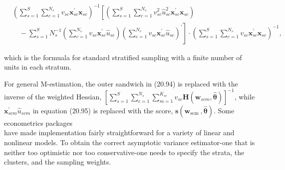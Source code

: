 \documentclass[10pt]{article}
\begin{document}
\begin{align*}
& \left(\sum_{s=1}^{S} \sum_{c=1}^{N_{s}} v_{s c} \mathbf{x}_{s c}^{\prime} \mathbf{x}_{s c}\right)^{-1}\left[\left(\sum_{s=1}^{S} \sum_{c=1}^{N_{s}} v_{s c}^{2} \hat{u}_{s c}^{2} \mathbf{x}_{s c}^{\prime} \mathbf{x}_{s c}\right)\right. \\
& \left.\quad-\sum_{s=1}^{S} N_{s}^{-1}\left(\sum_{c=1}^{N_{s}} v_{s c} \mathbf{x}_{s c}^{\prime} \hat{u}_{s c}\right)\left(\sum_{c=1}^{N_{s}} v_{s c} \mathbf{x}_{s c}^{\prime} \hat{u}_{s c}\right)^{\prime}\right] \cdot\left(\sum_{s=1}^{S} \sum_{c=1}^{N_{s}} v_{s c} \mathbf{x}_{s c}^{\prime} \mathbf{x}_{s c}\right)^{-1}, \tag{20.96}
\end{align*}


which is the formuala for standard stratified sampling with a finite number of units in each stratum.

For general M-estimation, the outer sandwich in (20.94) is replaced with the inverse of the weighted Hessian, $\left[\sum_{s=1}^{S} \sum_{c=1}^{N_{s}} \sum_{m=1}^{K_{s c}} v_{s c} \mathbf{H}\left(\mathbf{w}_{s c m}, \hat{\boldsymbol{\theta}}\right)\right]^{-1}$, while $\mathbf{x}_{s c m}^{\prime} \hat{u}_{s c m}$ in equation (20.95) is replaced with the score, $\mathbf{s}\left(\mathbf{w}_{\text {scm }}, \hat{\boldsymbol{\theta}}\right)$. Some econometrics packages\\
have made implementation fairly straightforward for a variety of linear and nonlinear models. To obtain the correct asymptotic variance estimator-one that is neither too optimistic nor too conservative-one needs to specify the strata, the clusters, and the sampling weights.
\end{document}
